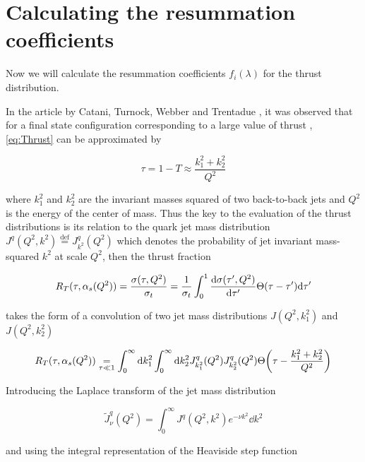 \documentclass[../main.tex]{subfiles}
\begin{document}
\section{Calculating the resummation coefficients}\label{sec:f_coeff}

Now we will calculate the resummation coefficients $f_i(\lambda)$ for the thrust distribution.

In the article by Catani, Turnock, Webber and Trentadue \cite{CATANI1991491}, it was observed that 
for a final state configuration corresponding to a large value of thrust , \cref{eq:Thrust} can be approximated by

\begin{equation}
    \tau = 1-T \approx \frac{k_1^2+k_2^2}{Q^2}
\end{equation}

where $k_1^2$ and $k_2^2$ are the invariant masses squared of two back-to-back jets and $Q^2$ is the energy of the center of mass.
Thus the key to the evaluation of the thrust distributions is its relation to the quark jet mass distribution $J^q(Q^2,k^2)\stackrel{\text{def}}{=}J^q_{k^2}(Q^2)$ which denotes
the probability of jet invariant mass-squared $k^2$ at scale $Q^2$, then the thrust fraction 

\begin{equation}
    R_T(\tau,\alpha_s(Q^2)) = \frac{\sigma(\tau,Q^2)}{\sigma_t} = \frac{1}{\sigma_t} 
    \int_0^1 \dv{\sigma(\tau',Q^2)}{\tau'} \Theta \qty(\tau - \tau') \dd \tau'
\end{equation}

takes the form of a convolution of two jet mass distributions $J(Q^2,k_1^2)$ and $J(Q^2,k_2^2)$

\begin{equation}\label{eq:Thrust fraction convolution}
    R_T(\tau,\alpha_s(Q^2)) \underset{\tau \ll 1}{=} \int_0^\infty \dd k_1^2 \int_0^\infty  \dd k_2^2 J^q_{k_1^2}(Q^2) J^q_{k_2^2}(Q^2) \Theta\qty(\tau - \frac{k_1^2+k_2^2}{Q^2}) 
\end{equation}

Introducing the Laplace transform of the jet mass distribution

\begin{equation}\label{eq:laplace_jet_mass}
    \tilde{J}^q_\nu(Q^2) = \int_0^\infty J^q(Q^2,k^2) e^{-\nu k^2} \dd k^2 
\end{equation}

and using the integral representation of the Heaviside step function
\end{document}
